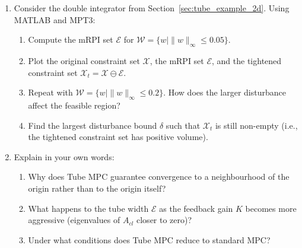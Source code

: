 \begin{enumerate}
	\item Consider the double integrator from Section~\ref{sec:tube_example_2d}. Using MATLAB and MPT3:
	\begin{enumerate}
		\item Compute the mRPI set $\mathcal{E}$ for $\mathcal{W} = \{w \mid \|w\|_\infty \le 0.05\}$.
		\item Plot the original constraint set $\mathcal{X}$, the mRPI set $\mathcal{E}$, and the tightened constraint set $\mathcal{X}_t = \mathcal{X} \ominus \mathcal{E}$.
		\item Repeat with $\mathcal{W} = \{w \mid \|w\|_\infty \le 0.2\}$. How does the larger disturbance affect the feasible region?
		\item Find the largest disturbance bound $\delta$ such that $\mathcal{X}_t$ is still non-empty (i.e., the tightened constraint set has positive volume).
	\end{enumerate}

	\item Explain in your own words:
	\begin{enumerate}
		\item Why does Tube MPC guarantee convergence to a neighbourhood of the origin rather than to the origin itself?
		\item What happens to the tube width $\mathcal{E}$ as the feedback gain $K$ becomes more aggressive (eigenvalues of $A_{cl}$ closer to zero)?
		\item Under what conditions does Tube MPC reduce to standard MPC?
	\end{enumerate}

\end{enumerate}
